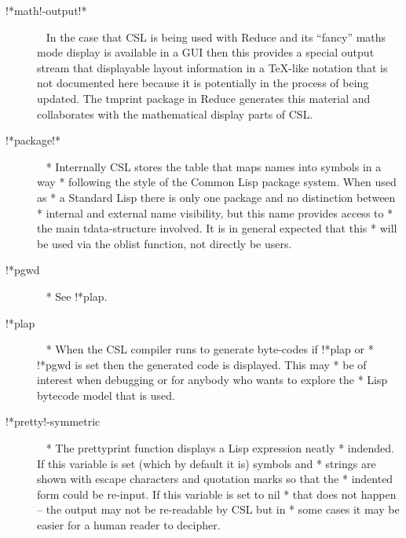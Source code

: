 \documentclass[a4paper,11pt]{article}
\begin{document}
\begin{description}
\item [{\ttfamily !*math!-output!*}]  ~\newline
In the case that CSL is being used with Reduce and its ``fancy'' maths mode
display is available in a GUI then this provides a special output
stream that displayable layout information in a {\TeX}-like notation that
is not documented here because it is potentially in the process of being
updated. The {\ttfamily tmprint} package in Reduce generates this
material and collaborates with the mathematical display parts of CSL.

\item [{\ttfamily !*package!*}]  ~\newline
  * Interrnally CSL stores the table that maps names into symbols in a way
  * following the style of the Common Lisp package system. When used as
  * a Standard Lisp there is only one package and no distinction between
  * internal and external name visibility, but this name provides access to
  * the main tdata-structure involved. It is in general expected that this
  * will be used via the {\ttfamily oblist} function, not directly be users.

\item [{\ttfamily !*pgwd}]  ~\newline
  * See {\ttfamily !*plap}.

\item [{\ttfamily !*plap}]  ~\newline
  * When the CSL compiler runs to generate byte-codes if {\ttfamily !*plap} or
  * {\ttfamily !*pgwd} is set then the generated code is displayed. This may
  * be of interest when debugging or for anybody who wants to explore the
  * Lisp bytecode model that is used.

\item [{\ttfamily !*pretty!-symmetric}]  ~\newline
  * The {\ttfamily prettyprint} function displays a Lisp expression neatly
  * indended. If this variable is set (which by default it is) symbols and
  * strings are shown with escape characters and quotation marks so that the
  * indented form could be re-input. If this variable is set to {\ttfamily nil}
  * that does not happen -- the output may not be re-readable by CSL but in
  * some cases it may be easier for a human reader to decipher.


\end{description}
\end{document}
